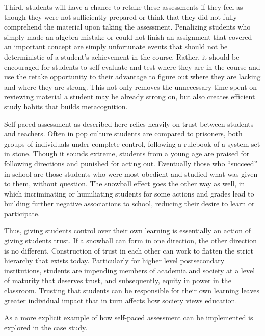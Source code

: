 Third, students will have a chance to retake these assessments if they feel as though they were not sufficiently prepared or think that they did not fully comprehend the material upon taking the assessment. Penalizing students who simply made an algebra mistake or could not finish an assignment that covered an important concept are simply unfortunate events that should not be deterministic of a student's achievement in the course. Rather, it should be encouraged for students to self-evaluate and test where they are in the course and use the retake opportunity to their advantage to figure out where they are lacking and where they are strong. This not only removes the unnecessary time spent on reviewing material a student may be already strong on, but also creates efficient study habits that builds metacognition.

Self-paced assessment as described here relies heavily on trust between students and teachers. Often in pop culture students are compared to prisoners, both groups of individuals under complete control, following a rulebook of a system set in stone. Though it sounds extreme, students from a young age are praised for following directions and punished for acting out. Eventually those who ``succeed'' in school are those students who were most obedient and studied what was given to them, without question. The snowball effect goes the other way as well, in which incriminating or humiliating students for some actions and grades lead to building further negative associations to school, reducing their desire to learn or participate.

Thus, giving students control over their own learning is essentially an action of giving students trust. If a snowball can form in one direction, the other direction is no different. Construction of trust in each other can work to flatten the strict hierarchy that exists today. Particularly for higher level postsecondary institutions, students are impending members of academia and society at a level of maturity that deserves trust, and subsequently, equity in power in the classroom. Trusting that students can be responsible for their own learning leaves greater individual impact that in turn affects how society views education.

As a more explicit example of how self-paced assessment can be implemented is explored in the case study.
